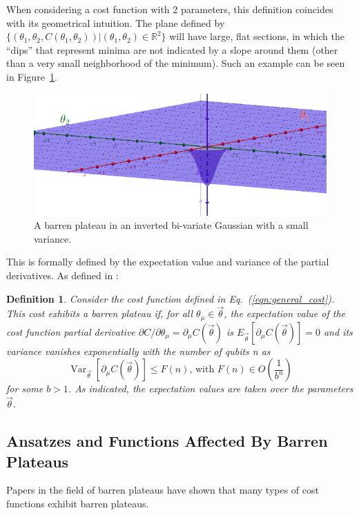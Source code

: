 \documentclass[a4paper,12pt]{article}
\newcommand{\thetas}{\vec{\theta}}
\newcommand{\del}{\partial}
\DeclareMathOperator{\Var}{Var}
\newtheorem{definition}{Definition}
\begin{document}
When considering a cost function with 2 parameters, this definition coincides with its geometrical intuition. The plane defined by $\{(\theta_1, \theta_2, C(\theta_1, \theta_2)) | (\theta_1, \theta_2) \in \mathbb{R}^2\}$ will have large, flat sections, in which the ``dips'' that represent minima are not indicated by a slope around them (other than a very small neighborhood of the minimum). Such an example can be seen in Figure~\ref{fig:bp}.

\begin{figure}[h]
    \centering
    \includegraphics[scale=0.5]{bp_3d.png}
    \caption{A barren plateau in an inverted bi-variate Gaussian with a small variance.}
    \label{fig:bp}
\end{figure}

This is formally defined by the expectation value and variance of the partial derivatives.
As defined in \cite{arrasmith_effect_2021}:

\begin{definition} \label{def:bp}
    Consider the cost function defined in Eq.~(\ref{eqn:general_cost}). This cost exhibits a barren plateau if, for all $\theta_\mu \in \thetas$, the expectation value of the cost function partial derivative
    $\del C / \del\theta_\mu = \del_\mu C(\thetas)$
    is
    $E_{\thetas}[\del_\mu C(\thetas)] = 0$
    and its variance vanishes exponentially with the number of qubits n as 
    \begin{equation} \label{eqn:vanishing}
        \Var_{\thetas}[\del_\mu C(\thetas)] \leq F(n) \textrm{,   with   }F(n) \in O\left(\frac{1}{b^n}\right)
    \end{equation}
    for some $b > 1$. As indicated, the expectation values are taken over the parameters $\thetas$.
\end{definition}

\subsection{Ansatzes and Functions Affected By Barren Plateaus}
Papers in the field of barren plateaus have shown that many types of cost functions exhibit barren plateaus.
\end{document}
